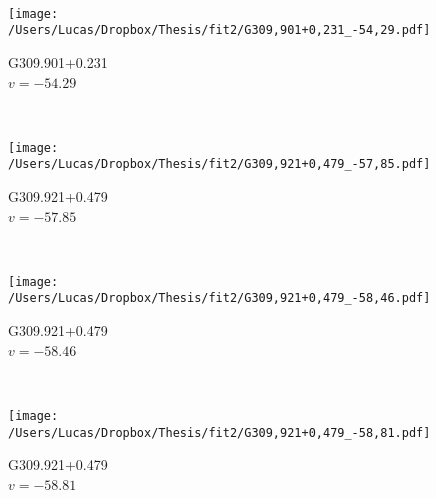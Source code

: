\begin{figure*}[t]
\begin{subfigure}[t]{0.3\textwidth}
	\end{subfigure}
	~
	\begin{subfigure}[t]{0.3\textwidth}
		\texttt{[image: /Users/Lucas/Dropbox/Thesis/fit2/G309,901+0,231\_-54,29.pdf]}
		\caption[]{G309.901+0.231\\$v=-54.29$\,\kms}
	\end{subfigure}
	~
	\begin{subfigure}[t]{0.3\textwidth}
		\texttt{[image: /Users/Lucas/Dropbox/Thesis/fit2/G309,921+0,479\_-57,85.pdf]}
		\caption[]{G309.921+0.479\\$v=-57.85$\,\kms}
	\end{subfigure}
	~
	\begin{subfigure}[t]{0.3\textwidth}
		\texttt{[image: /Users/Lucas/Dropbox/Thesis/fit2/G309,921+0,479\_-58,46.pdf]}
		\caption[]{G309.921+0.479\\$v=-58.46$\,\kms}
	\end{subfigure}
	~
	\begin{subfigure}[t]{0.3\textwidth}
		\texttt{[image: /Users/Lucas/Dropbox/Thesis/fit2/G309,921+0,479\_-58,81.pdf]}
		\caption[]{G309.921+0.479\\$v=-58.81$\,\kms}
	\end{subfigure}
	~
\end{figure*}
\clearpage
